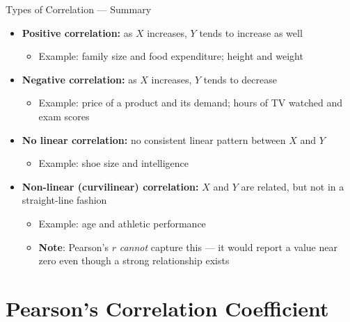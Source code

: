 \documentclass[12pt, aspectratio=169]{beamer}
\begin{document}
    \begin{frame}{Types of Correlation --- Summary}
        \begin{itemize}
            \item \textbf{Positive correlation:} as $X$ increases, $Y$ tends to
                increase as well
            \begin{itemize}
                \item Example: family size and food expenditure; height and weight
            \end{itemize}
            \item \textbf{Negative correlation:} as $X$ increases, $Y$ tends to
                decrease
            \begin{itemize}
                \item Example: price of a product and its demand; hours of TV
                    watched and exam scores
            \end{itemize}
            \item \textbf{No linear correlation:} no consistent linear pattern
                between $X$ and $Y$
            \begin{itemize}
                \item Example: shoe size and intelligence
            \end{itemize}
            \item \textbf{Non-linear (curvilinear) correlation:} $X$ and $Y$ are
                related, but not in a straight-line fashion
            \begin{itemize}
                \item Example: age and athletic performance
                \item \textbf{Note}: Pearson's $r$ \emph{cannot} capture this ---
                    it would report a value near zero even though a strong
                    relationship exists
            \end{itemize}
        \end{itemize}
    \end{frame}


    \section{Pearson's Correlation Coefficient}
\end{document}
